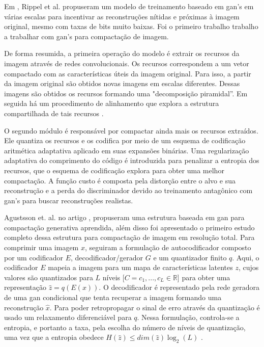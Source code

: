 Em \cite{GAN2017Rippel}, Rippel et al. propuseram um modelo de treinamento baseado em \acrshort{gan}'s em várias escalas para incentivar as reconstruções nítidas e próximas à imagem original, mesmo com taxas de bits muito baixas. Foi o primeiro trabalho trabalho a trabalhar com \acrshort{gan}'s para compactação de imagem. 

De forma resumida, a primeira operação do modelo é extrair os recursos da imagem através de redes convolucionais. Os recursos correspondem a um vetor compactado com as características úteis da imagem original. Para isso, a partir da imagem original são obtidos novas imagens em escalas diferentes. Dessas imagens são obtidos os recursos formando uma  "decomposição piramidal''. Em seguida há um procedimento de alinhamento que explora a estrutura compartilhada de tais recursos \cite{GAN2017Rippel}.  

O segundo módulo é responsável por compactar ainda mais os recursos extraídos. Ele quantiza os recursos e os codifica por meio de um esquema de codificação aritmética adaptativa aplicado em suas expansões binárias. Uma regularização adaptativa do comprimento do código é introduzida para penalizar a entropia dos recursos, que o esquema de codificação explora para obter uma melhor compactação. 
A função custo é composta pela distorção entre o alvo e sua reconstrução e a perda do discriminador devido ao treinamento antagônico com \acrshort{gan}'s para buscar reconstruções realistas.

Agustsson et. al. no artigo \cite{agustsson2019generative}, propuseram uma estrutura baseada em \acrshort{gan} para compactação generativa aprendida, além disso foi apresentado o primeiro estudo completo dessa estrutura para compactação de imagem em resolução total. 
Para comprimir uma imagem $x$, seguiram a formulação de autocodificador composto por um codificador $E$, decodificador/gerador $G$  e um quantizador finito $q$. 
Aqui, o codificador $E$ mapeia a imagem para um mapa de características latentes $z$, cujos valores são quantizados para $L$ níveis [$C = {c_1,. . . , c_L}  \in \mathbb{R}$]  para obter uma representação $\hat{z} = q(E(x))$.
O decodificador é representado pela rede geradora de uma \acrshort{gan} condicional \cite{mirza2014conditional}  que tenta recuperar a imagem formando uma reconstrução $\hat{x}$.
Para poder retropropagar o sinal de erro através da quantização é usado um relaxamento diferenciável para $q$. Nessa formulação, controla-se a entropia, e portanto a taxa, pela escolha do número de níveis de quantização, uma vez que a entropia obedece  $H(\hat{z}) \leq dim(\hat{z}) \log_2(L)$  \cite{agustsson2019generative}. 

